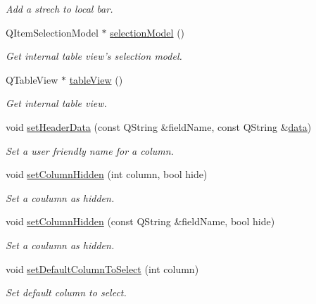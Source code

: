 \begin{DoxyCompactItemize}
\begin{DoxyCompactList}\small\item\em Add a strech to local bar. \end{DoxyCompactList}\item 
Q\-Item\-Selection\-Model $\ast$ \hyperlink{classmdt_sql_table_widget_a47fc691f2cd9cc40749c987ce2bbea6d}{selection\-Model} ()
\begin{DoxyCompactList}\small\item\em Get internal table view's selection model. \end{DoxyCompactList}\item 
Q\-Table\-View $\ast$ \hyperlink{classmdt_sql_table_widget_af40eeb001ec262830daba6b311927ede}{table\-View} ()
\begin{DoxyCompactList}\small\item\em Get internal table view. \end{DoxyCompactList}\item 
void \hyperlink{classmdt_sql_table_widget_a591461ee19f22008a5c310609461081e}{set\-Header\-Data} (const Q\-String \&field\-Name, const Q\-String \&\hyperlink{classmdt_abstract_sql_widget_a3d362ebfc2d4f4b40b48ca08db287b3c}{data})
\begin{DoxyCompactList}\small\item\em Set a user friendly name for a column. \end{DoxyCompactList}\item 
void \hyperlink{classmdt_sql_table_widget_a466ff75bee2a0efd99c62994f65a5d18}{set\-Column\-Hidden} (int column, bool hide)
\begin{DoxyCompactList}\small\item\em Set a coulumn as hidden. \end{DoxyCompactList}\item 
void \hyperlink{classmdt_sql_table_widget_ae1eefd42d91ea36fa4244d7f265d7222}{set\-Column\-Hidden} (const Q\-String \&field\-Name, bool hide)
\begin{DoxyCompactList}\small\item\em Set a coulumn as hidden. \end{DoxyCompactList}\item 
void \hyperlink{classmdt_sql_table_widget_a6c54d9c26f7bb6241607785586bcc52e}{set\-Default\-Column\-To\-Select} (int column)
\begin{DoxyCompactList}\small\item\em Set default column to select. \end{DoxyCompactList}\item 

\end{DoxyCompactItemize}
